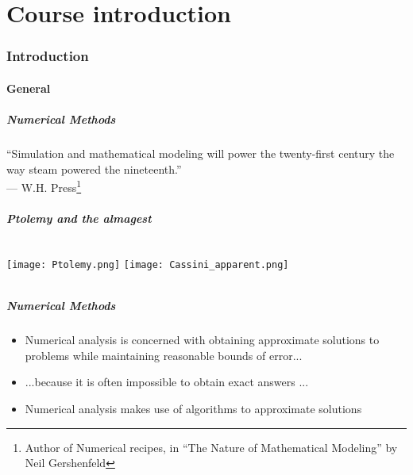\part{Course introduction}
\section{Introduction}
\subsection*{General}

{\nologo
\begin{frame}
  \frametitle{Numerical Methods}
  \renewcommand{\thefootnote}{$\star$} 
  {\LARGE ``Simulation and mathematical modeling will power the twenty-first century the way steam powered the nineteenth.''\\
  {\vspace{1em}\hspace{2em} --- W.H. Press\footnote{Author of Numerical recipes, in ``The Nature of Mathematical Modeling'' by Neil Gershenfeld }}} \\
  \vspace{-1cm}
  \flushright{}
\end{frame}


\begin{frame}
 \frametitle{Ptolemy and the almagest}
 \begin{columns}
   \centering
     \texttt{[image: Ptolemy.png]}
   \centering
     \texttt{[image: Cassini\_apparent.png]}   
 \end{columns} \vspace{1em}
\end{frame}
}

\begin{frame}
 \frametitle{Numerical Methods}
 \begin{itemize}
  \item Numerical analysis is concerned with obtaining approximate solutions to problems while maintaining reasonable bounds of error...
  \item ...because it is often impossible to obtain exact answers ...
  \item Numerical analysis makes use of algorithms to
approximate solutions
 \end{itemize}
\end{frame}

